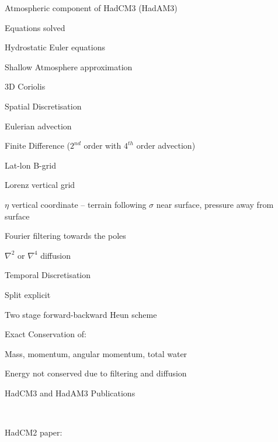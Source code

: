\begin{slide}{Atmospheric component of HadCM3 (HadAM3)}

\begin{list0}

\item Equations solved
\begin{list1}
\item Hydrostatic Euler equations
\item Shallow Atmosphere approximation
\item 3D Coriolis
\end{list1}

\item Spatial Discretisation
\begin{list1}
\item Eulerian advection
\item Finite Difference ($2^{nd}$ order with $4^{th}$ order advection)
\item Lat-lon B-grid
\item Lorenz vertical grid
\item $\eta$ vertical coordinate -- terrain following $\sigma$ near surface, pressure away from surface
\item Fourier filtering towards the poles
\item $\nabla^2$ or $\nabla^4$ diffusion
\end{list1}

\item Temporal Discretisation
\begin{list1}
\item Split explicit
\item Two stage forward-backward Heun scheme
\end{list1}

\item Exact Conservation of:
\begin{list1}
\item Mass, momentum, angular momentum, total water
\end{list1}
\item Energy not conserved due to filtering and diffusion

\end{list0}

\end{slide}

\begin{slide}{HadCM3 and HadAM3 Publications}

\ \\
\begin{list0}
\item {}
\item HadCM2 paper: 
\item {}
\item {}
\end{list0}

\end{slide}

